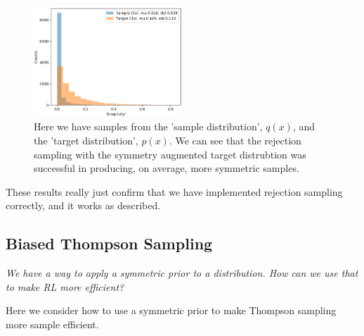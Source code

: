 \begin{figure}[h!]
  \centering
  \includegraphics[width=0.5\textwidth,height=0.25\textheight]{../../pictures/figures/s2-prior-rejection-8d.png}
  \caption{Here we have samples from the 'sample distribution', $q(x)$, and the 'target distribution', $p(x)$.
	We can see that the rejection sampling with the symmetry augmented target distrubtion was successful in producing, on average, more symmetric samples. }
\end{figure}

These results really just confirm that we have implemented
rejection sampling correctly, and it works as described.


%
%

\newpage
\subsection{Biased Thompson Sampling} \label{thompson-sampling}

\begin{displayquote}
\textsl{We have a way to apply a symmetric prior to a distribution.
How can we use that to make RL more efficient?}
\end{displayquote}

Here we consider how to use a symmetric prior to make Thompson sampling more sample efficient.

